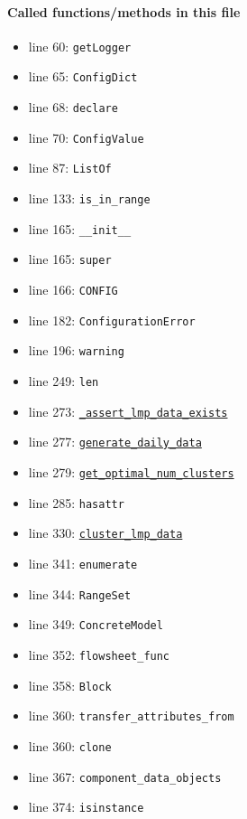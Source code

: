 \documentclass[11pt]{report}
\begin{document}
\paragraph{Called functions/methods in this file}
\begin{itemize}[leftmargin=*]
  \item line 60: \texttt{getLogger}
  \item line 65: \texttt{ConfigDict}
  \item line 68: \texttt{declare}
  \item line 70: \texttt{ConfigValue}
  \item line 87: \texttt{ListOf}
  \item line 133: \texttt{is\_in\_range}
  \item line 165: \texttt{\_\_init\_\_}
  \item line 165: \texttt{super}
  \item line 166: \texttt{CONFIG}
  \item line 182: \texttt{ConfigurationError}
  \item line 196: \texttt{warning}
  \item line 249: \texttt{len}
  \item line 273: \hyperref[def:pricetaker-price_taker_model.py:PriceTakerModel._assert_lmp_data_exists:L213]{\texttt{\_assert\_lmp\_data\_exists}}
  \item line 277: \hyperref[def:pricetaker-clustering.py:generate_daily_data:L35]{\texttt{generate\_daily\_data}}
  \item line 279: \hyperref[def:pricetaker-clustering.py:get_optimal_num_clusters:L142]{\texttt{get\_optimal\_num\_clusters}}
  \item line 285: \texttt{hasattr}
  \item line 330: \hyperref[def:pricetaker-clustering.py:cluster_lmp_data:L76]{\texttt{cluster\_lmp\_data}}
  \item line 341: \texttt{enumerate}
  \item line 344: \texttt{RangeSet}
  \item line 349: \texttt{ConcreteModel}
  \item line 352: \texttt{flowsheet\_func}
  \item line 358: \texttt{Block}
  \item line 360: \texttt{transfer\_attributes\_from}
  \item line 360: \texttt{clone}
  \item line 367: \texttt{component\_data\_objects}
  \item line 374: \texttt{isinstance}

\end{itemize}
\end{document}
